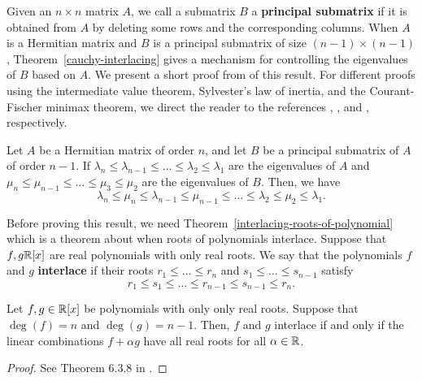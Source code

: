 \documentclass{puthesis-UG}
\begin{document}
Given an $n \times n$ matrix $A$, we call a submatrix $B$ a \textbf{principal submatrix} if it is obtained from $A$ by deleting some rows and the corresponding columns. When $A$ is a Hermitian matrix and $B$ is a principal submatrix of size $(n-1) \times (n-1)$, Theorem~\ref{cauchy-interlacing} gives a mechanism for controlling the eigenvalues of $B$ based on $A$. We present a short proof from \cite{fisk} of this result. For different proofs using the intermediate value theorem, Sylvester's law of inertia, and the Courant-Fischer minimax theorem, we direct the reader to the references \cite{suk}, \cite{symmetric-eigenvalue-problem}, and \cite{GoluVanl96}, respectively. 

\begin{thm} \label{cauchy-interlacing}
	Let $A$ be a Hermitian matrix of order $n$, and let $B$ be a principal submatrix of $A$ of order $n-1$. If $\lambda_n \leq \lambda_{n-1} \leq \ldots \leq \lambda_2 \leq \lambda_1$ are the eigenvalues of $A$ and $\mu_n \leq \mu_{n-1} \leq \ldots \leq \mu_3 \leq \mu_2$ are the eigenvalues of $B$. Then, we have
	\[
		\lambda_n \leq \mu_n \leq \lambda_{n-1} \leq \mu_{n-1} \leq \ldots \leq \lambda_2 \leq \mu_2 \leq \lambda_1.
	\]
\end{thm}

Before proving this result, we need Theorem~\ref{interlacing-roots-of-polynomial} which is a theorem about when roots of polynomials interlace. Suppose that $f, g \mathbb{R}[x]$ are real polynomials with only real roots. We say that the polynomials $f$ and $g$ \textbf{interlace} if their roots $r_1 \leq \ldots \leq r_n$ and $s_1 \leq \ldots \leq s_{n-1}$ satisfy
\[
	r_1 \leq s_1 \leq \ldots \leq r_{n-1} \leq s_{n-1} \leq r_n.
\]

\begin{thm} \label{interlacing-roots-of-polynomial}
	Let $f, g \in \mathbb{R}[x]$ be polynomials with only only real roots. Suppose that $\deg (f) = n$ and $\deg (g) = n-1$. Then, $f$ and $g$ interlace if and only if the linear combinations $f + \alpha g$ have all real roots for all $\alpha \in \mathbb{R}$. 
\end{thm} 
\begin{proof}
	See Theorem 6.3.8 in \cite{rahman}.
\end{proof}
\end{document}
